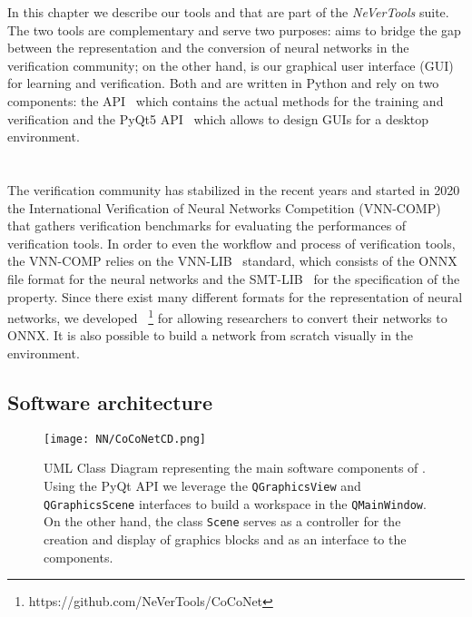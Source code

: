 In this chapter we describe our tools \coconet{} and \nevertwo{} that
are part of the \textit{NeVerTools} suite. The two tools are complementary 
and serve two purposes: \coconet{} aims to bridge the gap between the 
representation and the conversion of neural networks in the verification 
community; on the other hand, \nevertwo{} is our graphical user interface 
(GUI) for learning and verification.
Both \coconet{} and \nevertwo{} are written in Python and rely on two components:
the \pynever{} API~\cite{guidotti2021pynever} which contains the actual methods 
for the training and verification and the PyQt5 API~\cite{summerfield2007rapid}
which allows to design GUIs for a desktop environment.

\section{\coconet{}}
\label{sec:coconet}

The verification community has stabilized in the recent years and started in
2020 the International Verification of Neural Networks Competition
(VNN-COMP)~\cite{muller2022third} that gathers verification
benchmarks for evaluating the performances of verification tools. In order
to even the workflow and process of verification tools, the VNN-COMP relies
on the VNN-LIB~\cite{vnnlib} standard, which consists of the ONNX~\cite{onnx}
file format for the neural networks and the SMT-LIB~\cite{smtlib} for the
specification of the property. Since there exist many different formats for
the representation of neural networks, we developed 
\coconet{}~\footnote{https://github.com/NeVerTools/CoCoNet} for allowing
researchers to convert their networks to ONNX. It is also possible to build a
network from scratch visually in the environment.

\subsection{Software architecture}

\begin{figure}[t]
	\caption{\label{fig:cd_coconet} UML Class Diagram representing the main
		software components of \coconet. Using the PyQt API we leverage the
		\texttt{QGraphicsView} and \texttt{QGraphicsScene} interfaces to build
		a workspace in the \texttt{QMainWindow}. On the other hand, the class
		\texttt{Scene} serves as a controller for the creation and display of
		graphics blocks and as an interface to the \pynever{} components.}
	\centering
	\texttt{[image: NN/CoCoNetCD.png]}
\end{figure}

